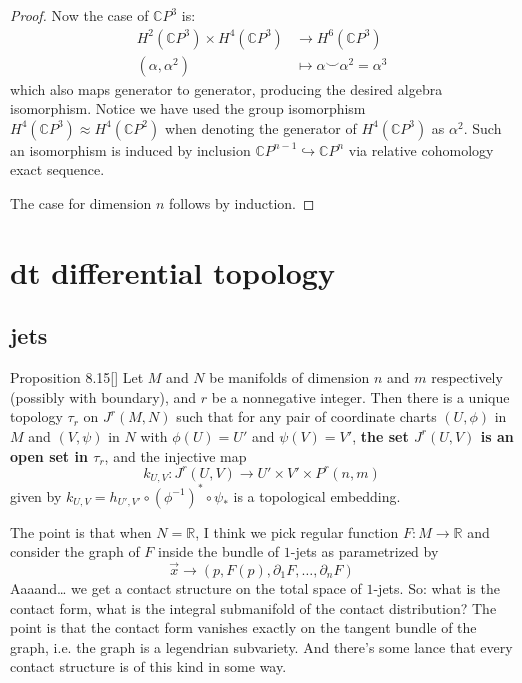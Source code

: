 \begin{proof}
	Now the case of $\mathbb{C} P^3$ is:
	\begin{align*}
		H^2(\mathbb{C} P^3)\times H^4(\mathbb{C} P^3)&\to H^6(\mathbb{C} P^3)\\
		(\alpha,\alpha^2)\qquad\quad&\mapsto\alpha\smile\alpha^2=\alpha^3
	\end{align*}
	which also  maps generator to generator, producing the desired algebra isomorphism. Notice we have used the group isomorphism $H^4(\mathbb{C} P^3)\approx H^4(\mathbb{C} P^2)$ when denoting the generator of $H^4(\mathbb{C} P^3)$ as $\alpha^2$. Such an isomorphism is induced by inclusion $\mathbb{C} P^{n-1}\hookrightarrow\mathbb{C} P^n$ via relative cohomology exact sequence.
	
	The case for dimension $n$ follows by induction.
\end{proof}



\chapter{dt differential topology}

\section{jets}
\begin{thing6}{Proposition 8.15}[\cite{muk}]\label{prop:8.15}\leavevmode
	Let \(M\) and \(N\) be manifolds of dimension \(n\) and \(m\) respectively (possibly with boundary), and \(r\) be a nonnegative integer. Then there is a unique topology \(\tau_r\) on \(J^r(M,N)\) such that for any pair of coordinate charts \((U,\phi)\) in \(M\) and \((V,\psi)\) in \(N\) with \(\phi(U)=U'\) and \(\psi(V)=V'\), \textbf{the set \(J^r(U,V)\) is an open set in \(\tau_r\)}, and the injective map
	\[k_{U,V}:J^r(U,V) \longrightarrow U'\times V' \times P^r(n,m)\]
given by \(k_{U,V}=h_{U',V'}\circ(\phi^{-1})^* \circ \psi_*\) is a topological embedding.
\end{thing6}

The point is that when \(N=\mathbb{R}\), I think we pick regular function \(F:M \to \mathbb{R}\) and consider the graph of \(F\) inside the bundle of \(1\)-jets as parametrized by
\[\vec{x} \to(p,F(p),\partial_1F,\ldots,\partial_nF)\]
Aaaand… we get a contact structure on the total space of \(1\)-jets. So: what is the contact form, what is the integral submanifold of the contact distribution? The point is that the contact form vanishes exactly on the tangent bundle of the graph, i.e. the graph is a legendrian subvariety. And there's some lance that every contact structure is of this kind in some way.

